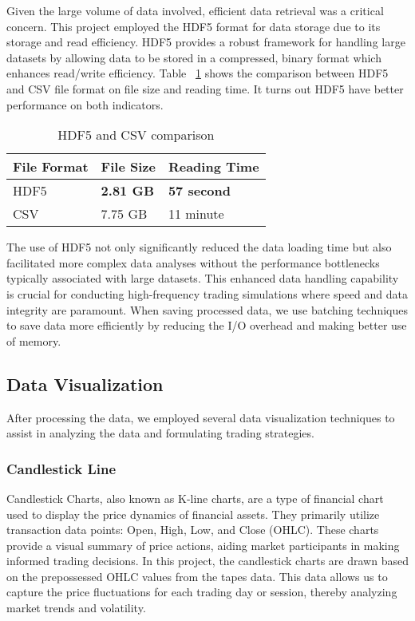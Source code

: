 \documentclass[conference]{IEEEtran}
\begin{document}
Given the large volume of data involved, efficient data retrieval was a critical concern. This project employed the HDF5 format for data storage due to its storage and read efficiency. HDF5 provides a robust framework for handling large datasets by allowing data to be stored in a compressed, binary format which enhances read/write efficiency. Table ~\ref{hdf5} shows the comparison between HDF5 and CSV file format on file size and reading time. It turns out HDF5 have better performance on both indicators. 

\begin{table}[tb]
\caption{HDF5 and CSV comparison}
\begin{center}
\begin{tabular}{|p{}|p{}|p{}|}
\hline
\textbf{File Format} & \textbf{File Size} & \textbf{Reading Time} \\
\hline
HDF5 & \textbf{2.81 GB} &  \textbf{57 second}\\
\hline
CSV & 7.75 GB & 11 minute\\
\hline
\end{tabular}
\label{hdf5}
\end{center}
\end{table}


The use of HDF5 not only significantly reduced the data loading time but also facilitated more complex data analyses without the performance bottlenecks typically associated with large datasets. This enhanced data handling capability is crucial for conducting high-frequency trading simulations where speed and data integrity are paramount. When saving processed data, we use batching techniques to save data more efficiently by reducing the I/O overhead and making better use of memory. 

\subsection{Data Visualization}
After processing the data, we employed several data visualization techniques to assist in analyzing the data and formulating trading strategies.
\subsubsection{Candlestick Line}
Candlestick Charts, also known as K-line charts, are a type of financial chart used to display the price dynamics of financial assets. They primarily utilize transaction data points: Open, High, Low, and Close (OHLC). These charts provide a visual summary of price actions, aiding market participants in making informed trading decisions. In this project, the candlestick charts are drawn based on the prepossessed OHLC values from the tapes data. This data allows us to capture the price fluctuations for each trading day or session, thereby analyzing market trends and volatility.
\end{document}
